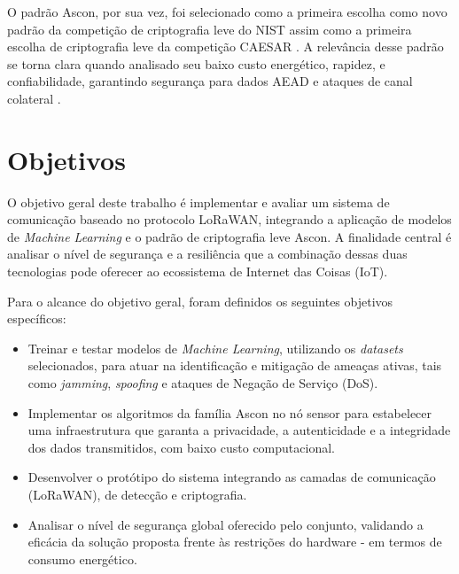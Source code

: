 O padrão Ascon, por sua vez, foi selecionado como a primeira escolha como novo padrão da competição de criptografia leve do NIST  assim como a primeira escolha de criptografia leve da competição CAESAR \cite{caesar_submissions}. A relevância desse padrão se torna clara quando analisado seu baixo custo energético, rapidez, e confiabilidade, garantindo segurança para dados AEAD e ataques de canal colateral \cite{ascon_official}.


\section{Objetivos}
O objetivo geral deste trabalho é implementar e avaliar um sistema de comunicação baseado no protocolo LoRaWAN, integrando a aplicação de modelos de \textit{Machine Learning} e o padrão de criptografia leve Ascon. A finalidade central é analisar o nível de segurança e a resiliência que a combinação dessas duas tecnologias pode oferecer ao ecossistema de Internet das Coisas (IoT).

Para o alcance do objetivo geral, foram definidos os seguintes objetivos específicos:

\begin{itemize}
    \item Treinar e testar modelos de \textit{Machine Learning}, utilizando os \textit{datasets} selecionados, para atuar na identificação e mitigação de ameaças ativas, tais como \textit{jamming}, \textit{spoofing} e ataques de Negação de Serviço (DoS).
    \item Implementar os algoritmos da família Ascon no nó sensor para estabelecer uma infraestrutura que garanta a privacidade, a autenticidade e a integridade dos dados transmitidos, com baixo custo computacional.
    \item Desenvolver o protótipo do sistema integrando as camadas de comunicação (LoRaWAN), de detecção e criptografia.
    \item Analisar o nível de segurança global oferecido pelo conjunto, validando a eficácia da solução proposta frente às restrições do hardware - em termos de consumo energético.
\end{itemize}



